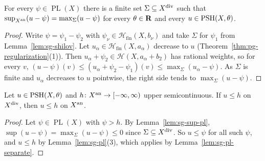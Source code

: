 \begin{lemma}\label{lem:sg-sup-pl}
\leanok
{}
For every $\psi\in\operatorname{PL}(X)$ there is a finite set $\Sigma\subseteq X^{\mathrm{div}}$ such that $\sup_{X^{\mathrm{an}}}(u-\psi)=\max_\Sigma(u-\psi)$ for every
$\theta\in\mathbf{R}$ and every $u\in\operatorname{PSH}(X,\theta)$.
\end{lemma}

\begin{proof}
Write $\psi=\psi_1-\psi_2$ with $\psi_\nu\in\mathcal H_{\mathrm{fin}}(X,b_\nu)$ and take $\Sigma$ for $\psi_1$ from Lemma~\ref{lem:sg-shilov}. Let
$u_\alpha\in\mathcal H_{\mathrm{fin}}(X,a_\alpha)$ decrease to $u$ (Theorem~\ref{thm:pg-regularization}(1)). Then
$u_\alpha+\psi_2\in\mathcal H(X,a_\alpha+b_2)$ has rational weights, so for every $v$,
$(u-\psi)(v)\le(u_\alpha+\psi_2-\psi_1)(v)\le\max_\Sigma(u_\alpha-\psi)$. As $\Sigma$ is finite and $u_\alpha$ decreases to $u$ pointwise, the right
side tends to $\max_\Sigma(u-\psi)$.
\end{proof}

\begin{theorem}\label{thm:sg-comparison}
\leanok
{}
Let $u\in\operatorname{PSH}(X,\theta)$ and $h\colon X^{\mathrm{an}}\to[-\infty,\infty)$ upper semicontinuous. If $u\le h$ on $X^{\mathrm{div}}$, then $u\le h$ on $X^{\mathrm{an}}$.
\end{theorem}

\begin{proof}
Let $\psi\in\operatorname{PL}(X)$ with $\psi>h$. By Lemma~\ref{lem:sg-sup-pl}, $\sup(u-\psi)=\max_\Sigma(u-\psi)\le0$ since $\Sigma\subseteq X^{\mathrm{div}}$. So
$u\le\psi$ for all such $\psi$, and $u\le h$ by Lemma~\ref{lem:sg-pl}(3), which applies by Lemma~\ref{lem:sg-pl-separate}.
\end{proof}

